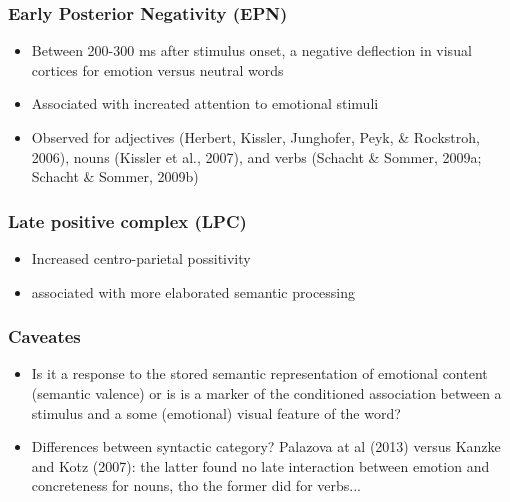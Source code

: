 \documentclass[12pt,letterpaper,table,svgnames,dvipsnames]{article}
\begin{document}
\subsubsection{Early Posterior Negativity (EPN)}


\begin{itemize}
    \item Between 200-300 ms after stimulus onset, a negative deflection in visual cortices for emotion versus neutral words

    \item Associated with increated attention to emotional stimuli

    \item Observed for adjectives (Herbert, Kissler, Junghofer, Peyk, \& Rockstroh, 2006), nouns (Kissler et al., 2007), and verbs (Schacht \& Sommer, 2009a; Schacht \& Sommer, 2009b)

\end{itemize}

\subsubsection{Late positive complex (LPC)}


\begin{itemize}
    \item Increased centro-parietal possitivity

    \item associated with more elaborated semantic processing

\end{itemize}


\subsubsection{Caveates}

\begin{itemize}
    \item Is it a response to the stored semantic representation of emotional content (semantic valence) or is is a marker of the conditioned association between a stimulus and a some (emotional) visual feature of the word?

    \item Differences between syntactic category? Palazova at al (2013) versus Kanzke and Kotz (2007): the latter found no late interaction between emotion and concreteness for nouns, tho the former did for verbs...

\end{itemize}
\end{document}
